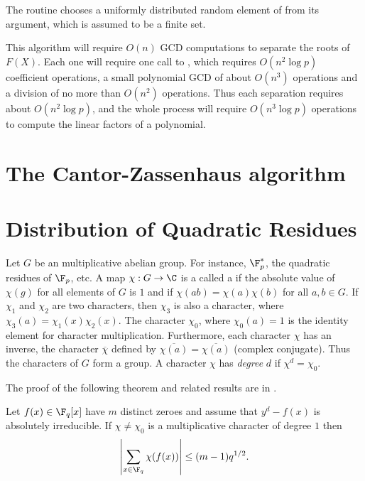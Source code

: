 \noindent
The routine  chooses a uniformly distributed random
element of from its argument, which is assumed to be a finite set.

This algorithm will require $O(n)$ GCD computations to separate the roots of
$F(X)$.  Each one will require one call to , which
requires $O(n^2 \log p)$ coefficient operations, a small polynomial GCD of
about $O(n^3)$ operations and a division of no more than $O(n^2)$ operations.
Thus each separation requires about $O(n^2 \log p)$, and the whole
process will require $O(n^3 \log p)$ operations to compute the
linear factors of a polynomial.

\section{The Cantor-Zassenhaus algorithm}

\section{Distribution of Quadratic Residues}
\label{Distribution:QR:Sec}

Let $G$ be an multiplicative abelian group.  For instance, $\F_p^{\ast}$,
the quadratic residues of $\F_p$, etc.  A map $\chi: G \rightarrow \C$ is a
called a  if the absolute value of $\chi(g)$ for all
elements of $G$ is $1$ and if $\chi(ab) = \chi(a) \chi(b)$ for all $a, b
\in G$.  If $\chi_1$ and $\chi_2$ are two characters, then $\chi_3$ is also
a character, where $\chi_3(a) = \chi_1(x) \chi_2(x)$.  The character
$\chi_0$, where $\chi_0(a) = 1$ is the identity element for character
multiplication.  Furthermore, each character $\chi$ has an inverse, \eg{} the 
character $\overline{\chi}$ defined by $\overline{\chi(a)} =
\overline{\chi(a)}$ (complex conjugate).  Thus the characters of $G$ form a
group.  A character $\chi$ has {\em degree}
$d$ if $\chi^d = \chi_0$.

The proof of the following theorem and related results are in
\cite{Schmidt:Equations:FF}.

\begin{proposition}
\label{CharSum:Estimate:Prop}
Let $f(x) \in \F_q[x]$ have $m$ distinct zeroes and assume that $y^d -
f(x)$ is absolutely irreducible.  If $\chi \not= \chi_0$ is a
multiplicative character of degree $1$ then
\[
\left|\sum_{x \in \F_q} \chi(f(x))\right| \le (m-1) q^{1/2}.
\]
\end{proposition}


